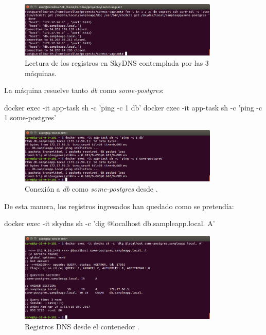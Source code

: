 \begin{figure}[H]
\centering
\includegraphics[width=0.85\textwidth]{images/figures/skydns-gets.png}
\caption{Lectura de los registros en SkyDNS contemplada por las 3 máquinas.}
\end{figure}

La máquina  resuelve tanto \textit{db} como \textit{some-postgres}:

\begin{code}
docker exec -it app-task sh -c 'ping -c 1 db'
docker exec -it app-task sh -c 'ping -c 1 some-postgres'
\end{code}

\begin{figure}[H]
\centering
\includegraphics[width=0.85\textwidth]{images/figures/skydns-ping.png}
\caption{Conexión a \textit{db} como \textit{some-postgres} desde .}
\end{figure}

De esta manera, los registros ingresados han quedado como se pretendía:

\begin{code}
docker exec -it skydns sh -c 'dig @localhost db.sampleapp.local. A'
\end{code}

\begin{figure}[H]
\centering
\includegraphics[width=0.85\textwidth]{images/figures/skydns-dig.png}
\caption{Registros DNS desde el contenedor .}
\end{figure}

